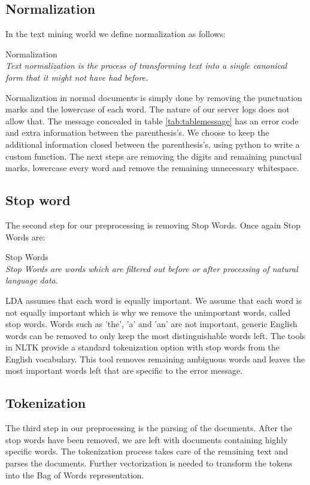 \subsection{Normalization}\label{methodology:normalization}
In the text mining world we define normalization as follows: \\

\theoremstyle{definition} 
\begin{definition}{Normalization} 
\\\textit{Text normalization is the process of transforming text into a single canonical form that it might not have had before.}
\end{definition}

Normalization in normal documents is simply done by removing the punctuation marks and the lowercase of each word. The nature of our server logs does not allow that. The message concealed in table \ref{tab:tablemessage} has an error code and extra information between the parenthesis's. We choose to keep the additional information closed between the parenthesis's, using python to write a custom function. The next steps are removing the digits and remaining punctual marks, lowercase every word and remove the remaining unnecessary whitespace. 

\subsection{Stop word}\label{methodology:stop_words}
The second step for our preprocessing is removing Stop Words. Once again Stop Words are:

\theoremstyle{definition} 
\begin{definition}{Stop Words} 
\\\textit{Stop Words are words which are filtered out before or after processing of natural language data.}
\end{definition}

LDA assumes that each word is equally important. We assume that each word is not equally important which is why we remove the unimportant words, called stop words. Words such as 'the', 'a' and 'an' are not important, generic English words can be removed to only keep the most distinguishable words left. 
The tools in NLTK provide a standard tokenization option with stop words from the English vocabulary. This tool removes remaining ambiguous words and leaves the most important words left that are specific to the error message. 

\subsection{Tokenization}\label{methodology:tokenization}
The third step in our preprocessing is the parsing of the documents. After the stop words have been removed, we are left with documents containing highly specific words. The tokenization process takes care of the remaining text and parses the documents. Further vectorization is needed to transform the tokens into the Bag of Words representation.

